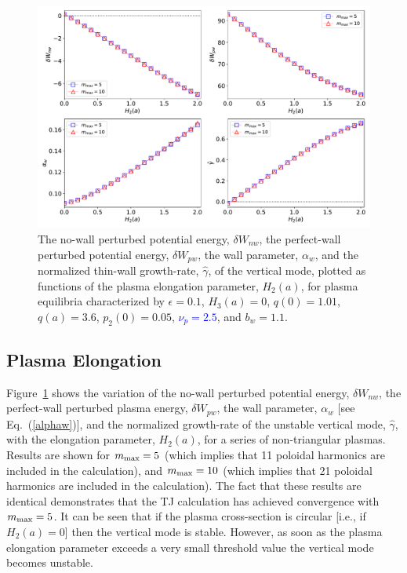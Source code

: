 \documentclass[12pt,prb,aps]{revtex4-1}
\begin{document}
\begin{figure}
\centerline{\includegraphics[width=\textwidth]{Fig1.pdf}}
\caption{The no-wall perturbed potential energy, $\delta W_{nw}$, the perfect-wall perturbed potential energy, $\delta W_{pw}$, the wall
parameter, $\alpha_w$, and the normalized thin-wall growth-rate, $\hat{\gamma}$,  of the  vertical mode, plotted as  functions of the
plasma elongation parameter, $H_2(a)$, for plasma equilibria characterized by  $\epsilon=0.1$, $H_3(a)=0$, $q(0)=1.01$, $q(a)=3.6$,  $p_2(0)=0.05$, \textcolor{blue}{$\nu_p=2.5$}, and $b_w=1.1$. \label{fig1}}
\end{figure}

\subsection{Plasma Elongation}
Figure~\ref{fig1} shows the variation of the no-wall perturbed potential energy, $\delta W_{nw}$, the perfect-wall perturbed plasma energy, $\delta W_{pw}$, the wall 
parameter, $\alpha_w$ [see Eq.~(\ref{alphaw})], and the normalized growth-rate of the unstable vertical mode, $\hat{\gamma}$,  with the elongation parameter, $H_2(a)$, for a series of non-triangular plasmas. Results are shown for $m_{\rm max} = 5$ (which implies that 11 poloidal harmonics are included in the calculation), and $m_{\rm max}=10$ 
(which implies that 21  poloidal harmonics are included in the calculation). The fact that these results are identical demonstrates that the TJ calculation has achieved convergence with
$m_{\rm max}=5$. 
It can be seen that if the
plasma cross-section is circular [i.e., if $H_2(a)=0$] then the vertical mode is stable. However, as soon as the plasma elongation parameter exceeds a very small threshold
value the vertical mode becomes unstable.
\end{document}
